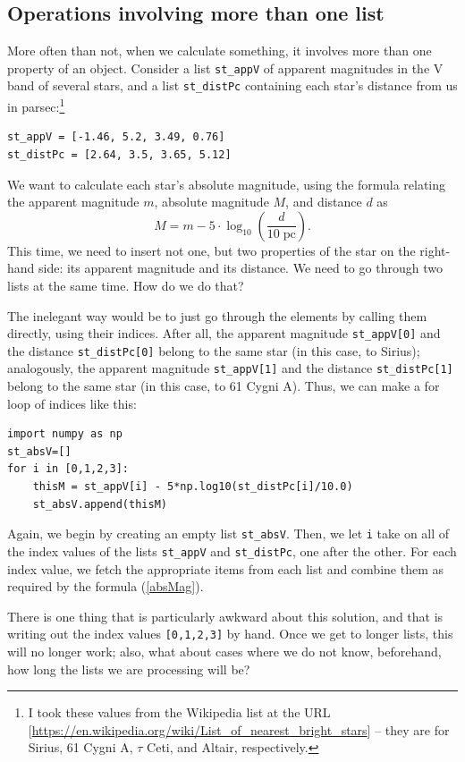\documentclass[twocolumn,apj]{openjournal}
\newcommand{\be}{\begin{equation}}
\newcommand{\ee}{\end{equation}}
\begin{document}
\subsection{Operations involving more than one list}

More often than not, when we calculate something, it involves more than one property of an object. Consider a list \verb|st_appV| of apparent magnitudes in the V band of several stars, and a list \verb|st_distPc| containing each star's distance from us in parsec:\footnote{I took these values from the Wikipedia list at the URL
[\href{https://en.wikipedia.org/wiki/List_of_nearest_bright_stars}{https://en.wikipedia.org/wiki/List\_of\_nearest\_bright\_stars}] -- they are
for Sirius, 61 Cygni A, $\tau$ Ceti, and Altair, respectively.}
\begin{lstlisting}
st_appV = [-1.46, 5.2, 3.49, 0.76]
st_distPc = [2.64, 3.5, 3.65, 5.12]
\end{lstlisting}

We want to calculate each star's absolute magnitude, using the formula relating the apparent magnitude $m$, absolute magnitude $M$, and distance $d$ as
\be
M = m - 5\cdot\log_{10}\left(\frac{d}{10\;\mbox{pc}}\right).
\label{absMag}
\ee
This time, we need to insert not one, but two properties of the star on the right-hand side: its apparent magnitude and its distance. We need to go through two lists at the same time. How do we do that?

The inelegant way would be to just go through the elements by calling them directly, using their indices. After all, the apparent magnitude \verb|st_appV[0]| and the distance \verb|st_distPc[0]| belong to the same star (in this case, to Sirius); analogously, the apparent magnitude \verb|st_appV[1]| and the distance \verb|st_distPc[1]| belong to the same star (in this case, to 61 Cygni A). Thus, we can make a for loop of indices like this:

\begin{lstlisting}
import numpy as np
st_absV=[]
for i in [0,1,2,3]:
	thisM = st_appV[i] - 5*np.log10(st_distPc[i]/10.0)
	st_absV.append(thisM)
\end{lstlisting}
Again, we begin by creating an empty list \verb|st_absV|. Then, we let \verb|i| take on all of the index values of the lists \verb|st_appV| and \verb|st_distPc|, one after the other. For each index value, we fetch the appropriate items from each list and combine them as required by the formula (\ref{absMag}).

There is one thing that is particularly awkward about this solution, and that is writing out the index values \verb|[0,1,2,3]| by hand. Once we get to longer lists, this will no longer work; also, what about cases where we do not know, beforehand, how long the lists we are processing will be?
\end{document}
